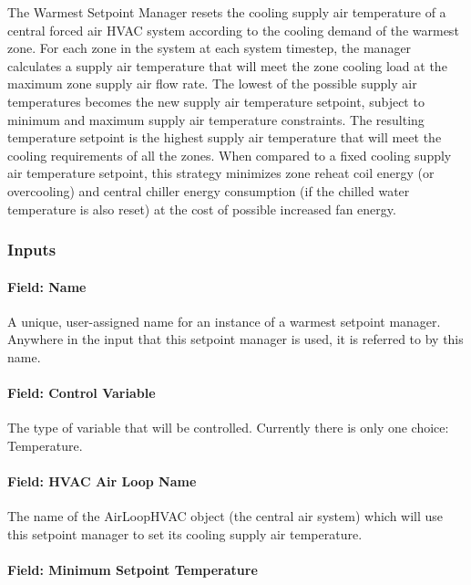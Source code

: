 The Warmest Setpoint Manager resets the cooling supply air temperature of a central forced air HVAC system according to the cooling demand of the warmest zone. For each zone in the system at each system timestep, the manager calculates a supply air temperature that will meet the zone cooling load at the maximum zone supply air flow rate. The lowest of the possible supply air temperatures becomes the new supply air temperature setpoint, subject to minimum and maximum supply air temperature constraints. The resulting temperature setpoint is the highest supply air temperature that will meet the cooling requirements of all the zones. When compared to a fixed cooling supply air temperature setpoint, this strategy minimizes zone reheat coil energy (or overcooling) and central chiller energy consumption (if the chilled water temperature is also reset) at the cost of possible increased fan energy.

\subsubsection{Inputs}\label{inputs-10-018}

\paragraph{Field: Name}\label{field-name-10-015}

A unique, user-assigned name for an instance of a warmest setpoint manager. Anywhere in the input that this setpoint manager is used, it is referred to by this name.

\paragraph{Field: Control Variable}\label{field-control-variable-10}

The type of variable that will be controlled. Currently there is only one choice: Temperature.

\paragraph{Field: HVAC Air Loop Name}\label{field-hvac-air-loop-name}

The name of the AirLoopHVAC object (the central air system) which will use this setpoint manager to set its cooling supply air temperature.

\paragraph{Field: Minimum Setpoint Temperature}\label{field-minimum-setpoint-temperature-1}

